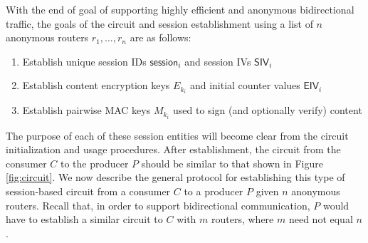 With the end of goal of supporting highly efficient and anonymous bidirectional traffic, the goals of the circuit and session establishment using a list of $n$ anonymous routers $r_1,\dots,r_n$ are as follows:
\begin{enumerate}
\item Establish unique session IDs $\mathsf{session}_{i}$ and session IVs $\mathsf{SIV}_i$
\item Establish content encryption keys $E_{k_i}$ and initial counter values $\mathsf{EIV}_i$
\item Establish pairwise MAC keys $M_{k_i}$ used to sign (and optionally verify) content
\end{enumerate}
The purpose of each of these session entities will become clear from the circuit initialization and usage procedures. After establishment, the circuit from the consumer $C$ to the producer $P$ should be similar to that shown in Figure \ref{fig:circuit}. We now describe the general protocol for establishing this type of session-based circuit from a consumer $C$ to a producer $P$ given $n$ anonymous routers. Recall that, in order to support bidirectional communication, $P$ would have to establish a similar circuit to $C$ with $m$ routers, where $m$ need not equal $n$. 
